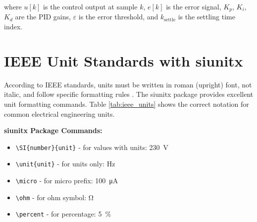 where $u[k]$ is the control output at sample $k$, $e[k]$ is the error signal, $K_p$, $K_i$, $K_d$ are the PID gains, $\varepsilon$ is the error threshold, and $k_{\text{settle}}$ is the settling time index.

\section{IEEE Unit Standards with siunitx}
\label{sec:ieee_units}

According to IEEE standards, units must be written in roman (upright) font, not italic, and follow specific formatting rules \cite{ieee2018style}. The siunitx package provides excellent unit formatting commands. Table \ref{tab:ieee_units} shows the correct notation for common electrical engineering units.

\textbf{siunitx Package Commands:}
\begin{itemize}
	\item \texttt{\textbackslash SI\{number\}\{unit\}} - for values with units: \SI{230}{\volt}
	\item \texttt{\textbackslash unit\{unit\}} - for units only: \unit{\hertz}
	\item \texttt{\textbackslash micro} - for micro prefix: \SI{100}{\micro\ampere}
	\item \texttt{\textbackslash ohm} - for ohm symbol: \unit{\ohm}
	\item \texttt{\textbackslash percent} - for percentage: \SI{5}{\percent}
\end{itemize}

